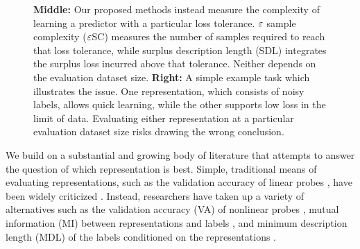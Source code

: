 \begin{figure}[t]
{\textbf{Middle:} Our proposed methods instead measure the complexity of learning a predictor with a particular loss tolerance.
$ \varepsilon$ sample complexity ($\varepsilon$SC) measures the number of samples required to reach that loss tolerance, while surplus description length (SDL) integrates the surplus loss incurred above that tolerance.
Neither depends on the evaluation dataset size.
\textbf{Right:} A simple example task which illustrates the issue.
One representation, which consists of noisy labels, allows quick learning, while the other supports low loss in the limit of data.
Evaluating either representation at a particular evaluation dataset size risks drawing the wrong conclusion.
}
\label{fig:fig}
\end{figure}



We build on a substantial and growing body of literature that attempts to answer the question of which representation is best.
Simple, traditional means of evaluating representations, such as the validation accuracy of linear probes \citep{ettinger2016probing,Shi2016String,Alain2016Understanding}, have been widely criticized \citep{Hnaff2020DataEfficientIR,resnick2019probing}.
Instead, researchers have taken up a variety of alternatives such as the validation accuracy (VA) of nonlinear probes \citep{Conneau2018Cram,Hnaff2020DataEfficientIR}, mutual information (MI) between representations and labels \citep{bachman2019learning, Pimentel2020InformationTheoreticPF}, and minimum description length (MDL) of the labels conditioned on the representations \citep{Blier2018TheDL,Yogatama2019LinguisticIntel,Voita2020InformationTheoreticPW}.


